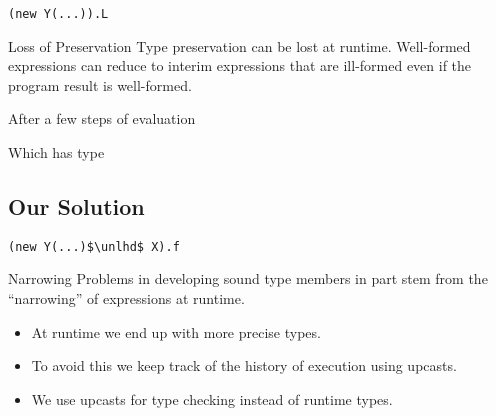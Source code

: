 \documentclass[dvipsnames]{beamer}
\begin{document}
\begin{lrbox}{\tmExPreservationC}
\begin{lstlisting}[mathescape, style=customlang]
(new Y(...)).L
\end{lstlisting}
\end{lrbox}

\begin{frame}{Loss of Preservation}
Type preservation can be lost at runtime. Well-formed expressions can reduce to interim expressions that are ill-formed even if the program result is well-formed.
\begin{block}{ }
\usebox{\tmExPreservationA}
\end{block}
After a few steps of evaluation
\begin{block}{ }
\usebox{\tmExPreservationB}
\end{block}
Which has type 
\begin{block}{ }
\usebox{\tmExPreservationC}
\end{block}
\end{frame}

\subsection{Our Solution}

\begin{lrbox}{\tmExPreservationD}
\begin{lstlisting}[mathescape, style=customlang]
(new Y(...)$\unlhd$ X).f
\end{lstlisting}
\end{lrbox}

\begin{frame}{Narrowing}
Problems in developing sound type members in part stem from the ``narrowing'' of expressions at runtime. 
\begin{itemize}
\item 
At runtime we end up with more precise types.
\item 
To avoid this we keep track of the history of execution using upcasts.
\item
We use upcasts for type checking instead of runtime types.
\end{itemize}
\begin{block}{ }
\usebox{\tmExPreservationD}
\end{block}

\end{frame}
\end{document}
